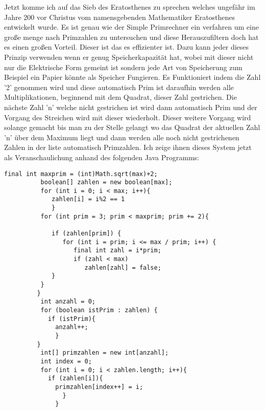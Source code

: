 Jetzt komme ich auf das Sieb des Eratosthenes zu sprechen welches ungefähr im Jahre 200 vor Christus vom namensgebenden Mathematiker Eratosthenes entwickelt wurde. Es ist genau wie der Simple Primrechner ein verfahren um eine große menge nach Primzahlen zu untersuchen und diese Herauszufiltern doch hat es einen großen Vorteil. Dieser ist das es effizienter ist. Dazu kann jeder dieses Prinzip verwenden wenn er genug Speicherkapazität hat, wobei mit dieser nicht nur die Elektrische Form gemeint ist sondern jede Art von Speicherung zum Beispiel ein Papier könnte als Speicher Fungieren. Es Funktioniert indem die Zahl '2' genommen wird und diese automatisch Prim ist daraufhin werden alle Multiplikationen, beginnend mit dem Quadrat, dieser Zahl gestrichen. Die nächste Zahl 'n' welche nicht gestrichen ist wird dann automatisch Prim und der Vorgang des Streichen wird mit dieser wiederholt. Dieser weitere Vorgang wird solange gemacht bis man zu der Stelle gelangt wo das Quadrat der aktuellen Zahl 'n' über dem Maximum liegt und dann werden alle noch nicht gestrichenen Zahlen in der liste automatisch Primzahlen.\newline 
Ich zeige ihnen dieses System jetzt als Veranschaulichung anhand des folgenden Java Programms:
\lstset{language=Java} 
\begin{lstlisting}[frame=single]
  final int maxprim = (int)Math.sqrt(max)+2;
	      boolean[] zahlen = new boolean[max];
	      for (int i = 0; i < max; i++){
	         zahlen[i] = i%2 == 1	    
	         }  
	      for (int prim = 3; prim < maxprim; prim += 2){

	         if (zahlen[prim]) { 
	            for (int i = prim; i <= max / prim; i++) {
	               final int zahl = i*prim;
	               if (zahl < max)
	                  zahlen[zahl] = false;
	         }
	      }
	     }  
	      int anzahl = 0;
	      for (boolean istPrim : zahlen) {
	        if (istPrim){
	          anzahl++;
	          }
	     }
	      int[] primzahlen = new int[anzahl];
	      int index = 0;
	      for (int i = 0; i < zahlen.length; i++){
	        if (zahlen[i]){
	          primzahlen[index++] = i;
				}	          
	          }
\end{lstlisting}